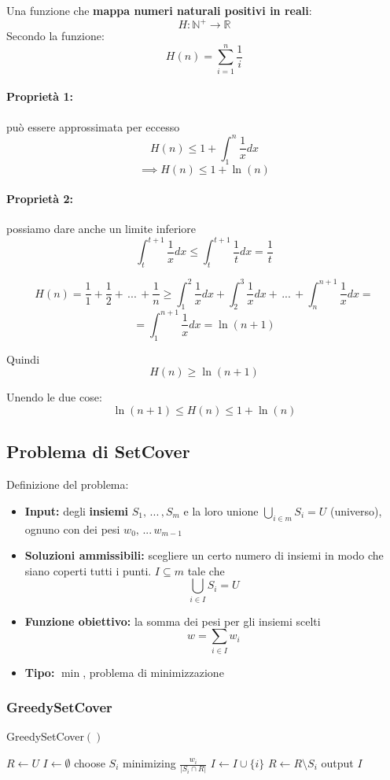 \documentclass[11pt]{article}
\begin{document}
	Una funzione che \textbf{mappa numeri naturali positivi in reali}:
	$$ H: \mathbb{N}^+ \rightarrow \mathbb{R} $$
	Secondo la funzione:
	$$ H(n) = \sum_{i=1}^n \frac{1}{i} $$
	
	\paragraph{Proprietà 1:}  può essere approssimata per eccesso
	$$ H(n) \leq 1 + \int_1^n \frac{1}{x} dx$$
	$$ \implies H(n) \leq 1 + \ln (n) $$
	
	\paragraph{Proprietà 2:} possiamo dare anche un limite inferiore
	$$ \int_t^{t+1} \frac{1}{x} dx \leq \int_t^{t+1} \frac{1}{t} dx = \frac{1}{t} $$
	
	$$ H(n) = \frac{1}{1} + \frac{1}{2} + \, ... \, + \frac{1}{n} \geq \int_{1}^{2} \frac{1}{x} dx + \int_{2}^{3} \frac{1}{x} dx + \, ... \, + \int_{n}^{n+1} \frac{1}{x} dx =$$
	$$ = \int_1^{n+1} \frac{1}{x} dx = \ln(n+1)$$
	
	Quindi 
	$$ H(n) \geq \ln(n+1) $$
	
	Unendo le due cose:
	$$ \ln (n+1) \leq H(n) \leq 1 + \ln(n) $$
	
	\newpage
	
	\subsection{Problema di SetCover}
	Definizione del problema:
	\begin{itemize}
		\item \textbf{Input:} degli \textbf{insiemi} $S_1, \, ... \, , S_m$ e la loro unione $\bigcup_{i \in m} S_i = U$ (universo), ognuno con dei pesi $w_0, \, ... \, w_{m-1}$
		
		\item \textbf{Soluzioni ammissibili:} scegliere un certo numero di insiemi in modo che siano coperti tutti i punti. $I \subseteq m$ tale che
		$$ \bigcup_{i \in I} S_i = U $$
		
		\item \textbf{Funzione obiettivo:} la somma dei pesi per gli insiemi scelti
		$$ w = \sum_{i \in I} w_i $$
		
		\item \textbf{Tipo:} $\min$, problema di minimizzazione
	\end{itemize}
	
	\subsubsection{GreedySetCover}
	\begin{algorithm}
		\caption{GreedySetCover$()$}
		\begin{algorithmic}
			\STATE $R \leftarrow U$
			\STATE $I \leftarrow \emptyset$
				\STATE choose $S_i$ minimizing $\frac{w_i}{|S_i \cap R|}$
				\STATE $I \leftarrow I \cup \{i\}$
				\STATE $R \leftarrow R \setminus S_i$
			\ENDWHILE
			\STATE output $I$
		\end{algorithmic}
	\end{algorithm}
	
\end{document}
